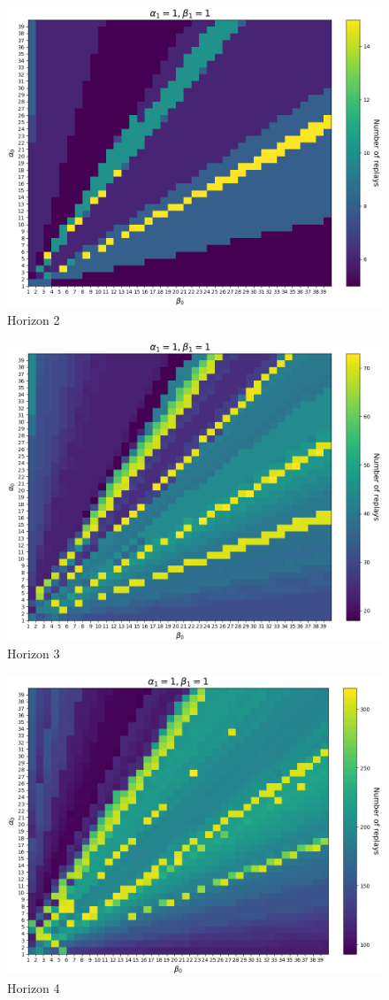 \documentclass{article}
\begin{document}
\begin{figure}[ht!]
    \centering
    \includegraphics[width=.75\textwidth]{../data/convergence/num_replays/horizon3_alpha1_beta1.png}
    \caption{Horizon 2}
\end{figure}
\begin{figure}[ht!]
    \centering
    \includegraphics[width=.75\textwidth]{../data/convergence/num_replays/horizon4_alpha1_beta1.png}
    \caption{Horizon 3}
\end{figure}
\begin{figure}[ht!]
    \centering
    \includegraphics[width=.75\textwidth]{../data/convergence/num_replays/horizon5_alpha1_beta1.png}
    \caption{Horizon 4}
\end{figure}
\end{document}
